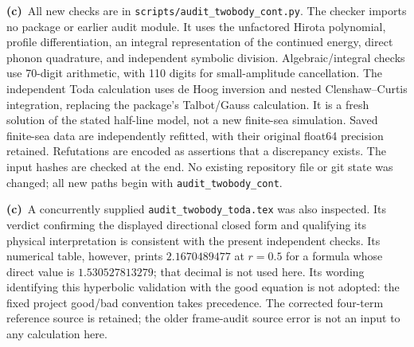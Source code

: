 \documentclass[11pt,a4paper]{article}
\newcommand{\Lc}{\textbf{(c)}\ }
\newcommand{\scr}{\texttt{audit\_\allowbreak twobody\_\allowbreak cont.py}}
\newcommand{\file}[1]{\nolinkurl{#1}}
\begin{document}
\Lc All new checks are in \file{scripts/}\scr. The checker imports no package
or earlier audit module. It uses the unfactored Hirota polynomial, profile
differentiation, an integral representation of the continued energy, direct
phonon quadrature, and independent symbolic division. Algebraic/integral checks
use 70-digit arithmetic, with 110 digits for small-amplitude cancellation.
The independent Toda calculation uses de Hoog inversion and nested
Clenshaw--Curtis integration, replacing the package's Talbot/Gauss calculation.
It is a fresh solution of the stated half-line model, not a new finite-sea
simulation. Saved finite-sea data are independently refitted, with their
original float64 precision retained. Refutations are encoded as assertions
that a discrepancy exists. The input hashes are checked at the end.
No existing repository file or git state was changed; all new paths begin
with \file{audit_twobody_cont}.

\Lc A concurrently supplied \file{audit_twobody_toda.tex} was also inspected.
Its verdict confirming the displayed directional closed form and qualifying
its physical interpretation is consistent with the present independent checks.
Its numerical table, however, prints $2.1670489477$ at $r=0.5$ for a formula
whose direct value is $1.530527813279$; that decimal is not used here.
Its wording identifying this hyperbolic validation with the good equation is
not adopted: the fixed project good/bad convention takes precedence.
The corrected four-term reference source is retained; the older frame-audit
source error is not an input to any calculation here.
\end{document}
